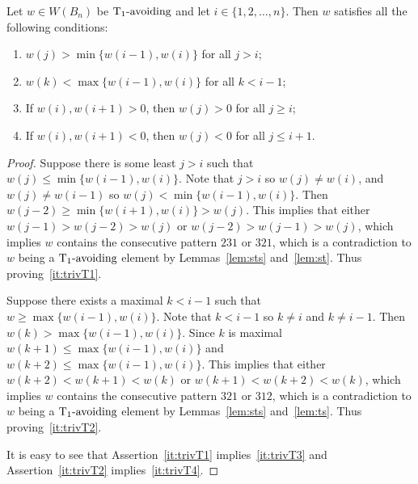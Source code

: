 \begin{lemma}\label{lem:prodofCommB}
Let $w \in W(B_n)$ be $\operatorname{T_1-\mathrm{avoiding}}$ and let $i \in \{1,2, \ldots, n\}$. Then $w$ satisfies all the following conditions:
\begin{enumerate}[leftmargin=2cm]
\item $w(j) > \min\{w(i-1), w(i)\}$ for all $j >i$;\label{it:trivT1}
\item $w(k) < \max\{w(i-1), w(i)\}$ for all $k < i-1$;\label{it:trivT2}
\item If $w(i), w(i+1) > 0$, then $w(j)>0$ for all $j \geq i$;\label{it:trivT3}
\item If $w(i), w(i+1) < 0$, then $w(j)<0$ for all $j \leq i+1$.\label{it:trivT4}
\end{enumerate}
\begin{proof}
	Suppose there is some least $j>i$ such that $w(j) \leq \min\{w(i-1), w(i)\}$. Note that $j>i$ so $w(j) \neq w(i)$, and $w(j) \neq w(i-1)$ so $w(j) < \min\{w(i-1), w(i)\}$. Then $w(j-2) \geq \min\{w(i+1), w(i)\}>w(j)$. This implies that either $w(j-1)>w(j-2)>w(j)$ or $w(j-2)>w(j-1)>w(j)$, which implies $w$ contains the consecutive pattern $231$ or $321$, which is a contradiction to $w$ being a $\operatorname{T_1-\mathrm{avoiding}}$ element by Lemmas~\ref{lem:sts} and~\ref{lem:st}. Thus proving~\ref{it:trivT1}.
	
	Suppose there exists a maximal $k<i-1$ such that $w \geq \max\{w(i-1), w(i)\}$. Note that $k < i-1$ so $k \neq i$ and $k \neq i-1$. Then $w(k)> \max\{w(i-1), w(i)\}$. Since $k$ is maximal $w(k+1) \leq  \max\{w(i-1), w(i)\}$ and $w(k+2) \leq \max\{w(i-1), w(i)\}$. This implies that either $w(k+2)<w(k+1)<w(k)$ or $w(k+1)<w(k+2)<w(k)$, which implies $w$ contains the consecutive pattern $321$ or $312$, which is a contradiction to $w$ being a $\operatorname{T_1-\mathrm{avoiding}}$ element by Lemmas~\ref{lem:sts} and~\ref{lem:ts}. Thus proving~\ref{it:trivT2}.
	
	It is easy to see that Assertion~\ref{it:trivT1} implies~\ref{it:trivT3} and Assertion~\ref{it:trivT2} implies~\ref{it:trivT4}.
\end{proof}	
\end{lemma}

